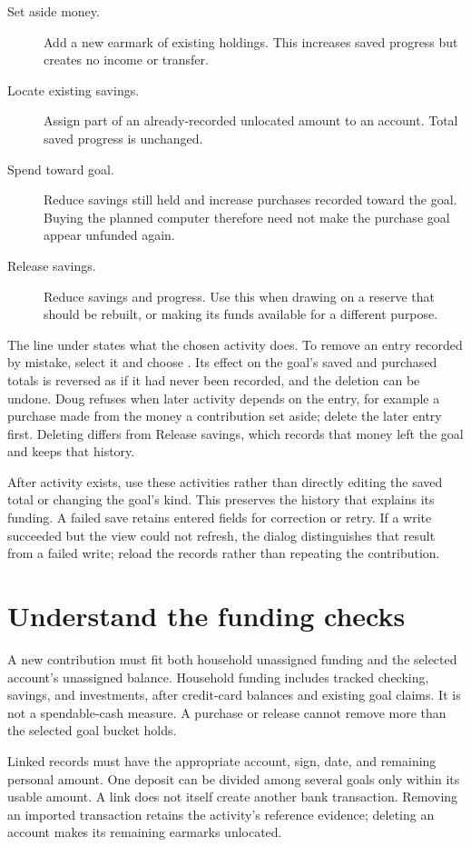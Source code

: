 \begin{description}
\item[Set aside money.] Add a new earmark of existing holdings. This increases saved progress but creates no income or transfer.
\item[Locate existing savings.] Assign part of an already-recorded unlocated amount to an account. Total saved progress is unchanged.
\item[Spend toward goal.] Reduce savings still held and increase purchases recorded toward the goal. Buying the planned computer therefore need not make the purchase goal appear unfunded again.
\item[Release savings.] Reduce savings and progress. Use this when drawing on a reserve that should be rebuilt, or making its funds available for a different purpose.
\end{description}

The line under  states what the chosen activity does. To remove an entry recorded by mistake, select it and choose . Its effect on the goal's saved and purchased totals is reversed as if it had never been recorded, and the deletion can be undone. Doug refuses when later activity depends on the entry, for example a purchase made from the money a contribution set aside; delete the later entry first. Deleting differs from Release savings, which records that money left the goal and keeps that history.

After activity exists, use these activities rather than directly editing the saved total or changing the goal's kind. This preserves the history that explains its funding. A failed save retains entered fields for correction or retry. If a write succeeded but the view could not refresh, the dialog distinguishes that result from a failed write; reload the records rather than repeating the contribution.

\section{Understand the funding checks}
A new contribution must fit both household unassigned funding and the selected account's unassigned balance. Household funding includes tracked checking, savings, and investments, after credit-card balances and existing goal claims. It is not a spendable-cash measure. A purchase or release cannot remove more than the selected goal bucket holds.

Linked records must have the appropriate account, sign, date, and remaining personal amount. One deposit can be divided among several goals only within its usable amount. A link does not itself create another bank transaction. Removing an imported transaction retains the activity's reference evidence; deleting an account makes its remaining earmarks unlocated.

